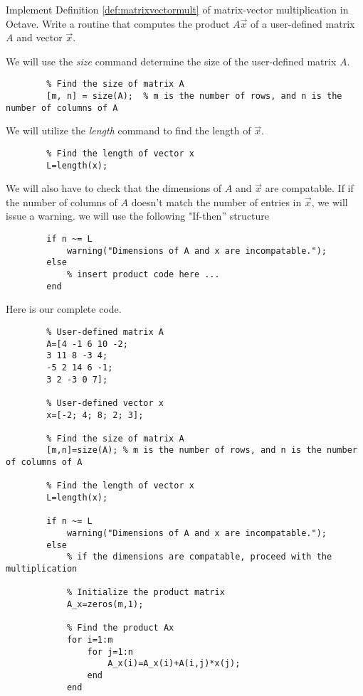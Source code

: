 \documentclass{ximera}
\begin{document}
    \begin{example}\label{ex:oct_mat_prod_def}
        Implement Definition \ref{def:matrixvectormult} of matrix-vector multiplication in Octave.  Write a routine that computes the product $A\vec{x}$ of a user-defined matrix $A$ and vector $\vec{x}$.

    \begin{explanation}
    We will use the \emph{size} command determine the size of the user-defined matrix $A$.  
    \begin{verbatim}
        % Find the size of matrix A
        [m, n] = size(A);  % m is the number of rows, and n is the number of columns of A
    \end{verbatim}
    We will utilize the \emph{length} command to find the length of $\vec{x}$.
    \begin{verbatim}
        % Find the length of vector x
        L=length(x);
    \end{verbatim}
    We will also have to check that the dimensions of $A$ and $\vec{x}$ are compatable.  If if the number of columns of $A$ doesn't match the number of entries in $\vec{x}$, we will issue a warning.  we will use the following "If-then'' structure
    \begin{verbatim}
        if n ~= L  
            warning("Dimensions of A and x are incompatable.");  
        else  
            % insert product code here ... 
        end    
    \end{verbatim}

    Here is our complete code.

    \begin{verbatim}
        % User-defined matrix A
        A=[4 -1 6 10 -2;
        3 11 8 -3 4;
        -5 2 14 6 -1;
        3 2 -3 0 7];

        % User-defined vector x
        x=[-2; 4; 8; 2; 3];

        % Find the size of matrix A
        [m,n]=size(A); % m is the number of rows, and n is the number of columns of A

        % Find the length of vector x
        L=length(x);

        if n ~= L
            warning("Dimensions of A and x are incompatable.");
        else
            % if the dimensions are compatable, proceed with the multiplication

            % Initialize the product matrix
            A_x=zeros(m,1);

            % Find the product Ax 
            for i=1:m
                for j=1:n
                    A_x(i)=A_x(i)+A(i,j)*x(j);
                end
            end


\end{verbatim}
\end{explanation}
\end{example}
\end{document}
